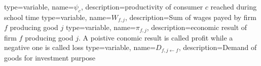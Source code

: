 {%
  type=variable,%
  name={$\psi_{c}$},%
  description={productivity of consumer $c$ reached during school time} 
}
{%
  type=variable,%
  name={$W_{f,j}$},%
  description={Sum of wages payed by firm $f$ producing good $j$} 
}
{%
  type=variable,%
  name={$\pi_{f,j}$},%
  description={economic result of firm $f$ producing good $j$. A poistive conomic result is called profit while a negative one is called loss} 
}
{%
  type=variable,%
  name={$D_{f,j\leftarrow f}$},%
  description={Demand of goods for investment purpose} 
}
